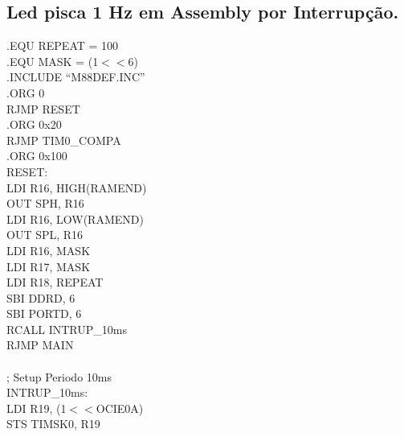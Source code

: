 \documentclass[titlepage, a4paper, 10pt, reqno, openany]{report}
\begin{document}
\subsection {Led pisca 1 Hz em Assembly por Interrup\c{c}\~{a}o.}
\begin{minipage}[T]{.3\linewidth}
.EQU REPEAT = 100 \\
.EQU MASK = (1$<<$6) \\
.INCLUDE \textquotedblleft M88DEF.INC\textquotedblright \\[0.5ex]
.ORG 0 \\
\hspace*{.5cm}	RJMP RESET \\
.ORG 0x20 \\
\hspace*{.5cm}	RJMP TIM0\_COMPA \\
.ORG 0x100 \\
RESET: \\
\hspace*{.5cm}	LDI R16, HIGH(RAMEND) \\
\hspace*{.5cm}	OUT SPH, R16 \\
\hspace*{.5cm}	LDI R16, LOW(RAMEND) \\
\hspace*{.5cm}	OUT SPL, R16 \\
\hspace*{.5cm}	LDI R16, MASK \\
\hspace*{.5cm}	LDI R17, MASK \\
\hspace*{.5cm}	LDI R18, REPEAT \\
\hspace*{.5cm}	SBI DDRD, 6 \\
\hspace*{.5cm}	SBI PORTD, 6 \\
\hspace*{.5cm}	RCALL INTRUP\_10ms \\
\hspace*{.5cm}	RJMP MAIN \\
\hspace*{.5cm}	\\
; Setup Periodo 10ms \\
INTRUP\_10ms: \\
\hspace*{.5cm}	LDI R19, (1$<<$OCIE0A) \\
\hspace*{.5cm}	STS TIMSK0, R19 \\

\end{minipage}
\end{document}
